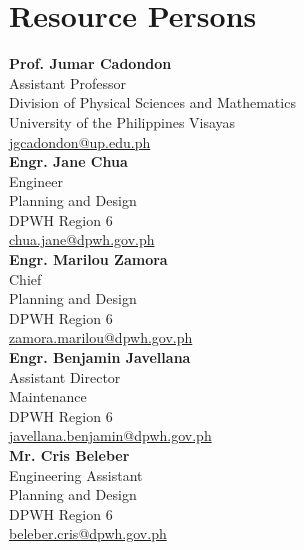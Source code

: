 %
%
%                 

\chapter{Resource Persons}
\label{sec:appendixb}

\newcommand{\resperson}[5]{%
	\textbf{#1} \\ %
	#2 \\          %
	#3 \\          %
	#4 \\          %
	\url{#5}       %
	\vspace{0.5em} \\
}

\resperson{Prof. Jumar Cadondon}{Assistant Professor}{Division of Physical Sciences and Mathematics}{University of the Philippines Visayas}{jgcadondon@up.edu.ph}

\resperson{Engr. Jane Chua}{Engineer}{Planning and Design}{DPWH Region 6}{chua.jane@dpwh.gov.ph}

\resperson{Engr. Marilou Zamora}{Chief}{Planning and Design}{DPWH Region 6}{zamora.marilou@dpwh.gov.ph}

\resperson{Engr. Benjamin Javellana}{Assistant Director}{Maintenance}{DPWH Region 6}{javellana.benjamin@dpwh.gov.ph}

\resperson{Mr. Cris Beleber}{Engineering Assistant}{Planning and Design}{DPWH Region 6}{beleber.cris@dpwh.gov.ph}